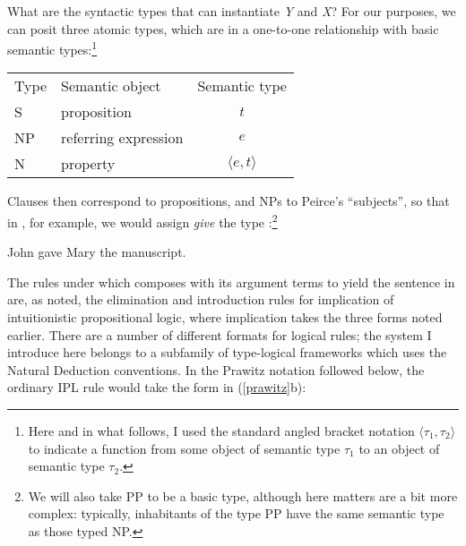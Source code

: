 \documentclass[output=paper,colorlinks,citecolor=brown]{langscibook}
\begin{document}
What are the syntactic types that can instantiate \textit{Y} and \textit{X}? For our
purposes, we can posit three atomic types, which are in a
one-to-one relationship with basic semantic types:\footnote{Here and
in what follows, I used the standard angled bracket notation
$\langle\tau_1,\tau_2\rangle$ to indicate a function from some object
of semantic type $\tau_1$ to an object of semantic type $\tau_2$.}

\begin{exe}
\ex\label{types}
\begin{tabular}[t]{llc}
Type & Semantic object & Semantic type\\
S & proposition & $t$\\
NP & referring expression & $e$ \\
N  & property & $\langle e,t\rangle$ \\
\end{tabular}
\end{exe}
Clauses then correspond to propositions, and NPs to Peirce's
``subjects'', so that in , for example, we would assign \textit{give}
the type :\footnote{We will also take PP to be a basic type,
although here matters are a bit more complex: typically, inhabitants of
the type PP have the same semantic type as those typed NP.}


\begin{exe}
 \ex\label{example}
  \begin{xlist}
 \ex\label{examplea}
    John gave Mary the manuscript.
 \ex\label{exampleb}
  \end{xlist}
\end{exe}
The rules under which  composes with its argument terms to
yield the sentence in  are, as noted, the elimination and
introduction rules for implication of intuitionistic propositional
logic, where implication takes the three forms noted earlier. There
are a number of different formats for logical rules; the system I
introduce here belongs to a subfamily of type-logical frameworks which
uses the Natural Deduction conventions. In the Prawitz notation followed
below, the ordinary IPL rule would take the form in (\ref{prawitz}b):
\end{document}
